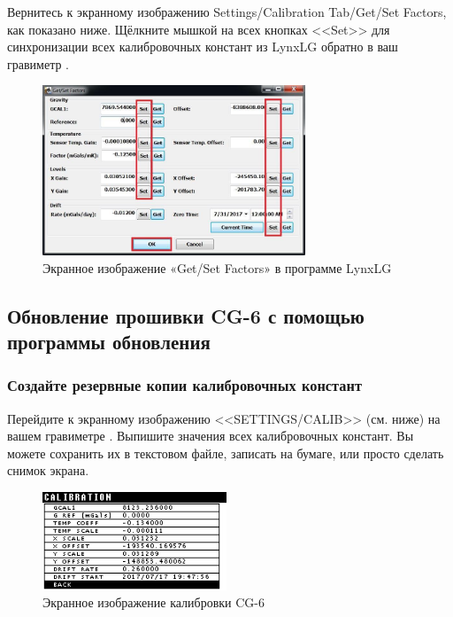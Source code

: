 Вернитесь к экранному изображению Settings/Calibration Tab/Get/Set Factors, как
показано ниже. Щёлкните мышкой на всех кнопках <<Set>> для синхронизации всех
калибровочных констант из LynxLG обратно в ваш гравиметр \cg{}.

\newpage
\begin{figure}[H]
  \centering
  \includegraphics[width=0.7\textwidth]{figures/the_lynxlg_sortware_get_set_factors_screen}
  \caption{Экранное изображение «Get/Set Factors» в программе LynxLG}
  \label{fig:the_lynxlg_sortware_get_set_factors_screen}
\end{figure}


\subsection[Обновление прошивки с помощью программы обновления]{Обновление
  прошивки CG-6 с помощью программы обновления}
\label{subsec:upgrade_the_cg6_firmware_with_cg6_firmware_updater_software}

\subsubsection{Создайте резервные копии калибровочных констант}

Перейдите к экранному изображению <<SETTINGS/CALIB>> (см. ниже) на вашем
гравиметре \cg{}. Выпишите значения всех калибровочных констант.  Вы можете
сохранить их в текстовом файле, записать на бумаге, или просто сделать снимок
экрана.

\begin{figure}[H]
  \centering
  \includegraphics[width=0.49\textwidth]{figures/the_cg6_calibration_screen}
  \caption{Экранное изображение калибровки CG-6}
  \label{fig:the_cg6_calibration_screen_2}
\end{figure}

